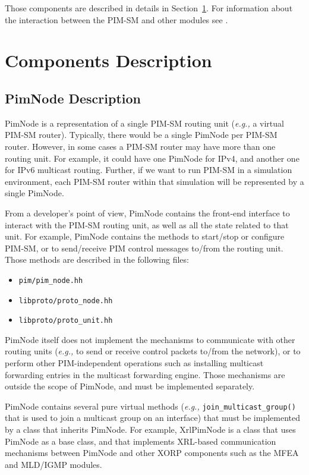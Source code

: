 \documentclass[11pt]{article}
\newcommand{\eg}{\emph{e.g.,}\xspace}
\begin{document}
Those components are described in details in
Section~\ref{sec:components_description}.
For information about the interaction between the PIM-SM and other modules
see \cite{xorp:multicast_arch}.


\section{Components Description}
\label{sec:components_description}


\subsection{PimNode Description}

PimNode is a representation of a single PIM-SM routing unit (\eg a
virtual PIM-SM router).
Typically, there would be a single PimNode per PIM-SM router.
However, in some cases a PIM-SM router may have more than one
routing unit. For example, it could have one PimNode for IPv4, and
another one for IPv6 multicast routing. Further, if we want to
run PIM-SM in a simulation environment, each PIM-SM router within that
simulation will be represented by a single PimNode.

From a developer's point of view, PimNode contains the front-end interface
to interact with the PIM-SM routing unit, as well as all the state
related to that unit. For example, PimNode contains the methods to
start/stop or configure PIM-SM, or to send/receive PIM control messages
to/from the routing unit. Those methods are described in the following files:

\begin{itemize}
  \item \verb=pim/pim_node.hh=
  \item \verb=libproto/proto_node.hh=
  \item \verb=libproto/proto_unit.hh=
\end{itemize}

PimNode itself does not implement the mechanisms to communicate with
other routing units (\eg to send or receive control packets to/from the
network), or to perform other PIM-independent operations such as
installing multicast forwarding entries in the multicast forwarding
engine. Those mechanisms are outside the scope of PimNode, and must be
implemented separately.

PimNode contains several pure virtual methods (\eg
\verb=join_multicast_group()= that is used to join a multicast group on
an interface) that must be implemented by a class that inherits PimNode.
For example, XrlPimNode is a class that uses PimNode as a base class,
and that implements XRL-based communication mechanisms between PimNode
and other XORP components such as the MFEA and MLD/IGMP modules.
\end{document}
